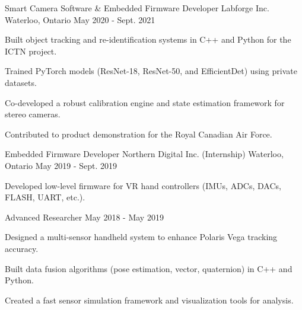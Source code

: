 \begin{cventries}
  \cventry
    {Smart Camera Software \& Embedded Firmware Developer} %
    {Labforge Inc.} %
    {Waterloo, Ontario} %
    {May 2020 - Sept. 2021} %
    {
      \begin{cvitems} %
        \item {Built object tracking and re-identification systems in C++ and Python for the ICTN project.}
        \item {Trained PyTorch models (ResNet-18, ResNet-50, and EfficientDet) using private datasets.}
        \item {Co-developed a robust calibration engine and state estimation framework for stereo cameras.}
        \item {Contributed to product demonstration for the Royal Canadian Air Force.}
      \end{cvitems}
    }

  \cventry
    {Embedded Firmware Developer } %
    {Northern Digital Inc. (Internship)} %
    {Waterloo, Ontario} %
    {May 2019 - Sept. 2019} %
    {
      \begin{cvitems} %
        \item {Developed low-level firmware for VR hand controllers (IMUs, ADCs, DACs, FLASH, UART, etc.).}
      \end{cvitems}
    }

  \cventry
    {Advanced Researcher } %
    {} %
    {} %
    {May 2018 - May 2019} %
    {
      \begin{cvitems} %
        \item {Designed a multi-sensor handheld system to enhance Polaris Vega tracking accuracy.}
        \item {Built data fusion algorithms (pose estimation, vector, quaternion) in C++ and Python.}
        \item {Created a fast sensor simulation framework and visualization tools for analysis.}
      \end{cvitems}
    }


\end{cventries}
